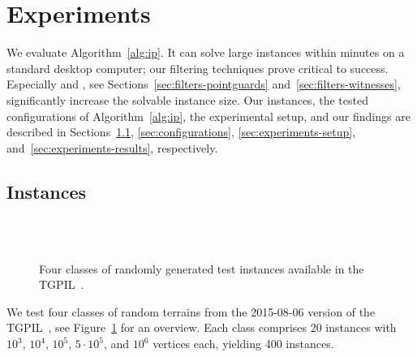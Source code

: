 \section{Experiments}
\label{sec:experiments}

We evaluate Algorithm~\ref{alg:ip}.
It can solve large instances within minutes on a standard desktop computer;
our filtering techniques prove critical to success.
Especially \pointguardfilter and \witnessfilter, see Sections~\ref{sec:filters-pointguards} and~\ref{sec:filters-witnesses}, significantly increase the solvable instance size.
Our instances, the tested configurations of Algorithm~\ref{alg:ip}, the experimental setup, and our findings are described in Sections~\ref{sec:experiments-instance-description}, \ref{sec:configurations}, \ref{sec:experiments-setup}, and~\ref{sec:experiments-results}, respectively.

\subsection{Instances}
\label{sec:experiments-instance-description}

\begin{figure}
	\centering
	 \\
	 \\
	\hspace{.03\linewidth}
	\caption{Four classes of randomly generated test instances available in the \acs{TGPIL}~\cite{tgpil}.}
	\label{fig:instance}
\end{figure}

We test four classes of random terrains from the 2015-08-06 version of the \ac{TGPIL}~\cite{tgpil}, see Figure~\ref{fig:instance} for an overview.
Each class comprises 20 instances with $10^3$, $10^4$, $10^5$, $5 \cdot 10^5$, and $10^6$ vertices each, yielding 400 instances.

